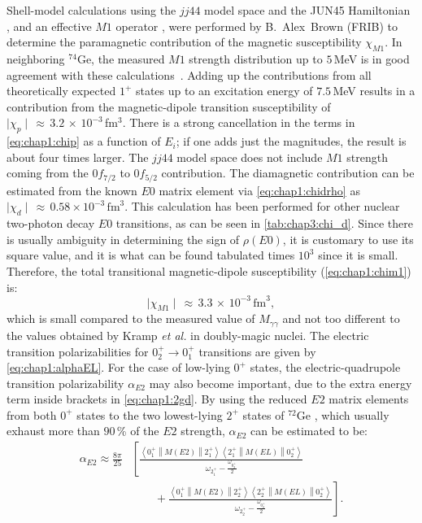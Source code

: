 \newpar
Shell-model calculations using the $jj44$ model space and the \textsc{JUN45} Hamiltonian \cite{jun45}, and an effective $M1$ operator \cite{jun45}, were performed by B.~Alex~Brown (\textsc{FRIB}) to determine the paramagnetic contribution of the magnetic susceptibility $\chi_{M1}$. 
In neighboring $^{74}\mathrm{Ge}$, the measured $M1$ strength distribution up to $5$\,MeV is in good agreement with these calculations~\cite{joh23}.
Adding up the contributions from all theoretically expected $1^+$ states up to an excitation energy of $7.5$\,MeV results in a contribution from the magnetic-dipole transition susceptibility of $\mid\chi_{p}\mid\,\approx\,3.2\,\times\,10^{-3}$\,fm$^{3}$.
There is a strong cancellation in the terms in \cref{eq:chap1:chip} as a function of $E_{i}$; if one adds just the magnitudes, the result is about four times larger. The $jj44$ model space does not include $M1$ strength coming from the $0f_{7/2}$ to $0f_{5/2}$ contribution.
\newpar
The diamagnetic contribution can be estimated from the known $E0$ matrix element \cite{Kibedi-2022} via \cref{eq:chap1:chidrho} as $\mid \chi _{d}\mid\,\approx\,0.58\times10^{-3}$\,$\mathrm{fm}^3$. This calculation has been performed for other nuclear two-photon decay $E0$ transitions, as can be seen in \cref{tab:chap3:chi_d}. Since there is usually ambiguity in determining the sign of $\rho\left(E0\right)$, it is customary to use its square value, and it is what can be found tabulated times $10^3$ since it is small.
Therefore, the total transitional magnetic-dipole susceptibility (\cref{eq:chap1:chim1}) is:
\begin{equation}
  \mid \chi_{M1}\mid\,\approx\,3.3\,\times\,10^{-3}\,\mathrm{fm}^{3},
\end{equation}
which is small compared to the measured value of $M_{\gamma\gamma}$ and not too different to the values obtained by Kramp {\it et al.} \cite{Kramp-1987} in doubly-magic nuclei.
\newpar
The electric transition polarizabilities for $0_2^{+}\rightarrow0_1^{+}$ transitions are given by \cref{eq:chap1:alphaEL}.
For the case of low-lying $0^{+}$ states, the electric-quadrupole transition polarizability $\alpha_{E2}$ may also become important, due to the extra energy term inside brackets in \cref{eq:chap1:2gd}. By using the reduced $E2$ matrix elements from both $0^{+}$ states to the two lowest-lying $2^{+}$ states of $^{72}\mathrm{Ge}$ \cite{AYANGEAKAA2016}, which usually exhaust more than $90$\,\% of the $E2$ strength, $\alpha_{E2}$ can be estimated to be:
\begin{align}
    \alpha_{E2} \approx \frac{8\pi}{25} &\left[ \frac{\left\langle 0_1^+ \middle\| M(E2) \middle\| 2^+_1 \right\rangle \left\langle 2^+_1 \middle\| M(EL) \middle\| 0_2^+ \right\rangle}{\omega_{2^+_1}-\frac{\omega_{0^+_2}}{2}} \right. \nonumber \\ 
    &\left. \qquad + \frac{\left\langle 0_1^+ \middle\| M(E2) \middle\| 2^+_2 \right\rangle \left\langle 2^+_2 \middle\| M(EL) \middle\| 0_2^+ \right\rangle}{\omega_{2^+_2}-\frac{\omega_{0^+_2}}{2}}\right].
    \label{eq:chap3:alphaE2_calc1}
\end{align}
